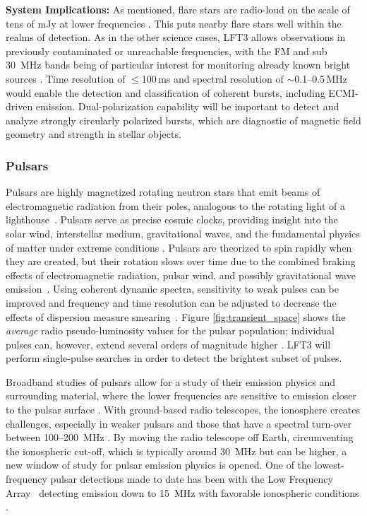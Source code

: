 \textbf{System Implications:} As mentioned, flare stars are radio-loud on the scale of tens of mJy at lower frequencies \citep{driessen_sydney_2024}. This puts nearby flare stars well within the realms of detection. As in the other science cases, LFT3 allows observations in previously contaminated or unreachable frequencies, with the FM and sub 30~MHz bands being of particular interest for monitoring already known bright sources \citep{joe_nature_review}. Time resolution of $\leq$100\,ms and spectral resolution of $\sim$0.1--0.5\,MHz would enable the detection and classification of coherent bursts, including ECMI-driven emission. Dual-polarization capability will be important to detect and analyze strongly circularly polarized bursts, which are diagnostic of magnetic field geometry and strength in stellar objects. 


\subsubsection{Pulsars}
Pulsars are highly magnetized rotating neutron stars that emit beams of electromagnetic radiation from their poles, analogous to the rotating light of a lighthouse~\citep{pulsar_handbook}. Pulsars serve as precise cosmic clocks, providing insight into the solar wind, interstellar medium, gravitational waves, and the fundamental physics of matter under extreme conditions \citep{sct+24,epta_inpta,ppta,agazie_nanograv_2023,Basu2025_SKA_EOS}. Pulsars are theorized to spin rapidly when they are created, but their rotation slows over time due to the combined braking effects of electromagnetic radiation, pulsar wind, and possibly gravitational wave emission~\citep{agf+16}. Using coherent dynamic spectra, sensitivity to weak pulses can be improved and frequency and time resolution can be adjusted to decrease the effects of dispersion measure smearing~\citep{cm03}. Figure \ref{fig:transient_space} shows the \textit{average} radio pseudo-luminosity values for the pulsar population; individual pulses can, however, extend several orders of magnitude higher \citep{karuppusamy_giant_2010}. LFT3 will perform single-pulse searches in order to detect the brightest subset of pulses. 


Broadband studies of pulsars allow for a study of their emission physics and surrounding material, where the lower frequencies are sensitive to emission closer to the pulsar surface \citep{hassall_wide-band_2012}. With ground-based radio telescopes, the ionosphere creates challenges, especially in weaker pulsars and those that have a spectral turn-over between 100--200~MHz \citep{Stappers_2011,jankowski_spectral_2018}. By moving the radio telescope off Earth, circumventing the ionospheric cut-off, which is typically around 30~MHz but can be higher, a new window of study for pulsar emission physics is opened. One of the lowest-frequency pulsar detections made to date has been with the Low Frequency Array~\citep{lofar} detecting emission down to 15~MHz with favorable ionospheric conditions \citep{Kondratiev_2013}.

